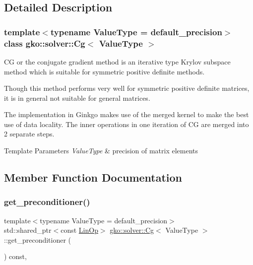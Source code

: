 \subsection{Detailed Description}
\subsubsection*{template$<$typename Value\+Type = default\+\_\+precision$>$\newline
class gko\+::solver\+::\+Cg$<$ Value\+Type $>$}

CG or the conjugate gradient method is an iterative type Krylov subspace method which is suitable for symmetric positive definite methods. 

Though this method performs very well for symmetric positive definite matrices, it is in general not suitable for general matrices.

The implementation in Ginkgo makes use of the merged kernel to make the best use of data locality. The inner operations in one iteration of CG are merged into 2 separate steps.


\begin{DoxyTemplParams}{Template Parameters}
{\em Value\+Type} & precision of matrix elements \\
\hline
\end{DoxyTemplParams}


\subsection{Member Function Documentation}
\mbox{\label{classgko_1_1solver_1_1Cg_a797544ecc8d86d2798014e7f5f5baf4f}} 
\subsubsection{\texorpdfstring{get\+\_\+preconditioner()}{get\_preconditioner()}}
{\footnotesize\ttfamily template$<$typename Value\+Type  = default\+\_\+precision$>$ \\
std\+::shared\+\_\+ptr$<$const \hyperlink{classgko_1_1LinOp}{Lin\+Op}$>$ \hyperlink{classgko_1_1solver_1_1Cg}{gko\+::solver\+::\+Cg}$<$ Value\+Type $>$\+::get\+\_\+preconditioner (\begin{DoxyParamCaption}{ }\end{DoxyParamCaption}) const\hspace{0.3cm}{\ttfamily [override]}, {\ttfamily [virtual]}}



